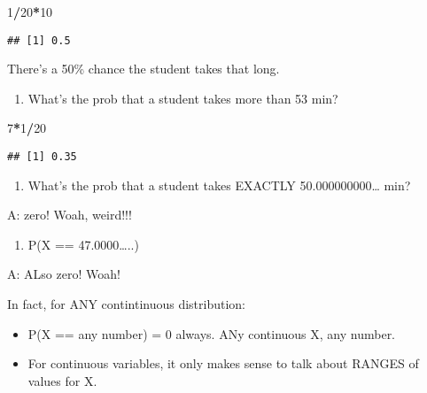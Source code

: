 \documentclass[]{article}
\newenvironment{Shaded}{\begin{snugshade}}{\end{snugshade}}
\newcommand{\DecValTok}[1]{\textcolor[rgb]{0.00,0.00,0.81}{#1}}
\newcommand{\OperatorTok}[1]{\textcolor[rgb]{0.81,0.36,0.00}{\textbf{#1}}}
\providecommand{\tightlist}{%
  \setlength{\itemsep}{0pt}\setlength{\parskip}{0pt}}
\begin{document}
\begin{Shaded}
\begin{Highlighting}[]
\DecValTok{1}\OperatorTok{/}\DecValTok{20}\OperatorTok{*}\DecValTok{10}
\end{Highlighting}
\end{Shaded}

\begin{verbatim}
## [1] 0.5
\end{verbatim}

There's a 50\% chance the student takes that long.

\begin{enumerate}
\def\labelenumi{\arabic{enumi})}
\setcounter{enumi}{1}
\tightlist
\item
  What's the prob that a student takes more than 53 min?
\end{enumerate}

\begin{Shaded}
\begin{Highlighting}[]
\DecValTok{7}\OperatorTok{*}\DecValTok{1}\OperatorTok{/}\DecValTok{20}
\end{Highlighting}
\end{Shaded}

\begin{verbatim}
## [1] 0.35
\end{verbatim}

\begin{enumerate}
\def\labelenumi{\arabic{enumi})}
\setcounter{enumi}{2}
\tightlist
\item
  What's the prob that a student takes EXACTLY 50.000000000\ldots{} min?
\end{enumerate}

A: zero! Woah, weird!!!

\begin{enumerate}
\def\labelenumi{\arabic{enumi})}
\setcounter{enumi}{3}
\tightlist
\item
  P(X == 47.0000\ldots{}..)
\end{enumerate}

A: ALso zero! Woah!

In fact, for ANY contintinuous distribution:

\begin{itemize}
\tightlist
\item
  P(X == any number) = 0 always. ANy continuous X, any number.\\
\item
  For continuous variables, it only makes sense to talk about RANGES of
  values for X.
\end{itemize}
\end{document}
